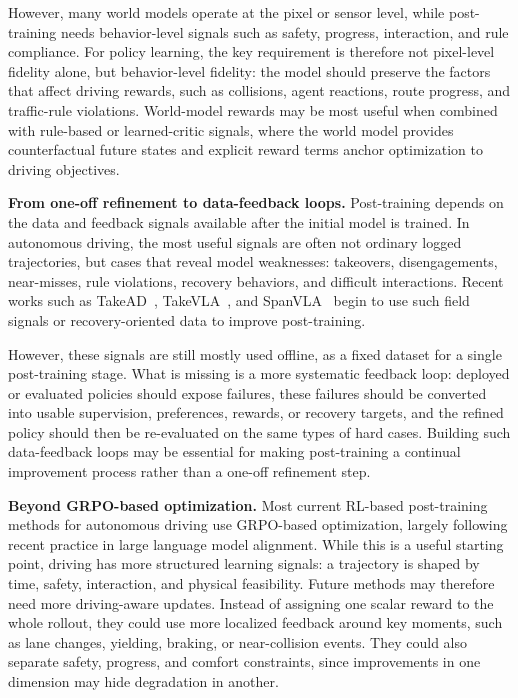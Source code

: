 \documentclass[runningheads]{llncs}
\begin{document}
However, many world models operate at the pixel or sensor level, while post-training needs behavior-level signals such as safety, progress, interaction, and rule compliance. For policy learning, the key requirement is therefore not pixel-level fidelity alone, but behavior-level fidelity: the model should preserve the factors that affect driving rewards, such as collisions, agent reactions, route progress, and traffic-rule violations. World-model rewards may be most useful when combined with rule-based or learned-critic signals, where the world model provides counterfactual future states and explicit reward terms anchor optimization to driving objectives.


\textbf{From one-off refinement to data-feedback loops.}
Post-training depends on the data and feedback signals available after the initial model is trained. In autonomous driving, the most useful signals are often not ordinary logged trajectories, but cases that reveal model weaknesses: takeovers, disengagements, near-misses, rule violations, recovery behaviors, and difficult interactions. Recent works such as TakeAD~\cite{takead2025}, TakeVLA~\cite{takevla2026}, and SpanVLA~\cite{spanvla2026} begin to use such field signals or recovery-oriented data to improve post-training.

However, these signals are still mostly used offline, as a fixed dataset for a single post-training stage. What is missing is a more systematic feedback loop: deployed or evaluated policies should expose failures, these failures should be converted into usable supervision, preferences, rewards, or recovery targets, and the refined policy should then be re-evaluated on the same types of hard cases. Building such data-feedback loops may be essential for making post-training a continual improvement process rather than a one-off refinement step.

\textbf{Beyond GRPO-based optimization.}
Most current RL-based post-training methods for autonomous driving use GRPO-based optimization, largely following recent practice in large language model alignment. While this is a useful starting point, driving has more structured learning signals: a trajectory is shaped by time, safety, interaction, and physical feasibility. Future methods may therefore need more driving-aware updates. Instead of assigning one scalar reward to the whole rollout, they could use more localized feedback around key moments, such as lane changes, yielding, braking, or near-collision events. They could also separate safety, progress, and comfort constraints, since improvements in one dimension may hide degradation in another. 
\end{document}
